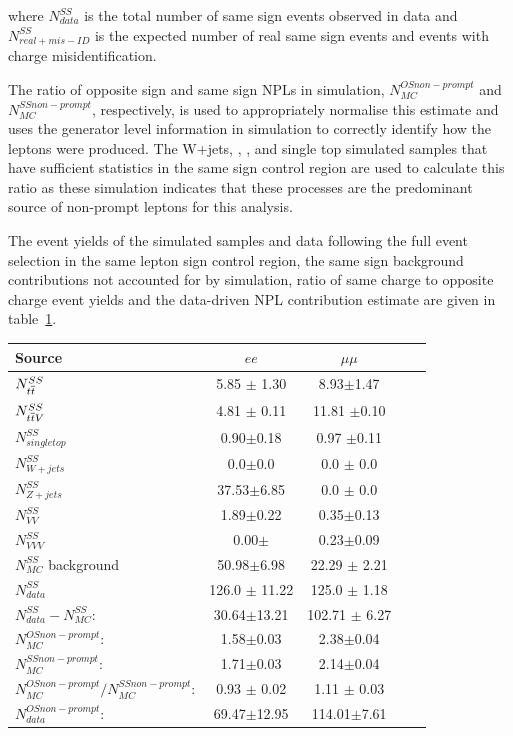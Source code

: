 where $N_{data}^{SS}$ is the total number of same sign events observed in data and $N^{SS}_{real + mis-ID}$ is the expected number of real same sign events and events with charge misidentification.

The ratio of opposite sign and same sign NPLs in simulation, $N_{MC}^{OS non-prompt}$ and $N_{MC}^{SS non-prompt}$, respectively, is used to appropriately normalise this estimate and uses the generator level information in simulation to correctly identify how the leptons were produced.
The W+jets, \ttZ, \ttW, and single top simulated samples that have sufficient statistics in the same sign control region are used to calculate this ratio as these simulation indicates that these processes are the predominant source of non-prompt leptons for this analysis.

The event yields of the simulated samples and data following the full event selection in the same lepton sign control region, the same sign background contributions not accounted for by simulation, ratio of same charge to opposite charge event yields and the data-driven NPL contribution estimate are given in table~\ref{tab:fakeLeptonYields}.

\begin{table}[htbp]
\centering
\begin{tabular}{l | cccc}
\hline
Source &  $ee$ & $\mu\mu$  \\ 
\hline
$N_{t\overline{t}}^{SS}$ & 5.85 $\pm$ 1.30 & 8.93$\pm$1.47    \\
$N_{t\overline{t} V}^{SS}$ & 4.81 $\pm$ 0.11 & 11.81 $\pm$0.10  \\ 
$N_{single top}^{SS}$ & 0.90$\pm$0.18 & 0.97 $\pm$0.11    \\
$N_{W+jets}^{SS}$ & 0.0$\pm$0.0 & 0.0 $\pm$ 0.0  \\
$N_{Z+jets}^{SS}$ & 37.53$\pm$6.85 & 0.0 $\pm$ 0.0  \\
$N_{VV}^{SS}$ & 1.89$\pm$0.22 & 0.35$\pm$0.13 \\
$N_{VVV}^{SS}$ & 0.00$\pm$ & 0.23$\pm$0.09 \\
\hline
$N_{MC}^{SS}$ background & 50.98$\pm$6.98 & 22.29 $\pm$ 2.21 \\ 
$N_{data}^{SS}$ & 126.0 $\pm$ 11.22 & 125.0 $\pm$ 1.18\\ 
\hline
$N_{data}^{SS} - N_{MC}^{SS}$: & 30.64$\pm$13.21 & 102.71 $\pm$ 6.27\\
\hline
$N_{MC}^{OS non-prompt}$: & 1.58$\pm$0.03 & 2.38$\pm$0.04 \\
$N_{MC}^{SS non-prompt}$: & 1.71$\pm$0.03 & 2.14$\pm$0.04 \\
$N_{MC}^{OS non-prompt}/N_{MC}^{SS non-prompt}$: & 0.93 $\pm$ 0.02 & 1.11 $\pm$ 0.03 \\
\hline
$N_{data}^{OS non-prompt}$: & 69.47$\pm$12.95 & 114.01$\pm$7.61 \\
\hline
\end{tabular}
\label{tab:fakeLeptonYields}
\end{table}

